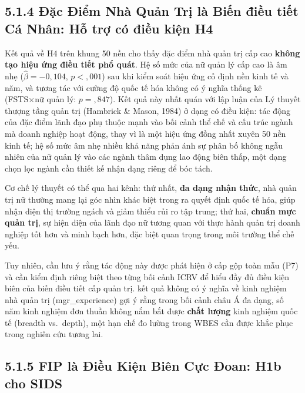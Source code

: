 \documentclass[
  a4paper,
  13pt]{extreport}
\begin{document}
\hypertarget{ux111ux1eb7c-ux111iux1ec3m-nhuxe0-quux1ea3n-trux1ecb-luxe0-biux1ebfn-ux111iux1ec1u-tiux1ebft-cuxe1-nhuxe2n-hux1ed7-trux1ee3-cuxf3-ux111iux1ec1u-kiux1ec7n-h4}{%
\subsection{5.1.4 Đặc Điểm Nhà Quản Trị là Biến điều tiết Cá Nhân: Hỗ
trợ có điều kiện
H4}\label{ux111ux1eb7c-ux111iux1ec3m-nhuxe0-quux1ea3n-trux1ecb-luxe0-biux1ebfn-ux111iux1ec1u-tiux1ebft-cuxe1-nhuxe2n-hux1ed7-trux1ee3-cuxf3-ux111iux1ec1u-kiux1ec7n-h4}}

Kết quả về H4 trên khung 50 nền cho thấy đặc điểm nhà quản trị cấp cao
\textbf{không tạo hiệu ứng điều tiết phổ quát}. Hệ số mức của nữ quản lý
cấp cao là âm nhẹ (\(\hat{\beta} = -0{,}104\), \(p < {,}001\)) sau khi
kiểm soát hiệu ứng cố định nền kinh tế và năm, và tương tác với cường độ
quốc tế hóa không có ý nghĩa thống kê (FSTS×nữ quản lý: \(p = {,}847\)).
Kết quả này nhất quán với lập luận của Lý thuyết thượng tầng quản trị
(Hambrick \& Mason, 1984) ở dạng có điều kiện: tác động của đặc điểm
lãnh đạo phụ thuộc mạnh vào bối cảnh thể chế và cấu trúc ngành mà doanh
nghiệp hoạt động, thay vì là một hiệu ứng đồng nhất xuyên 50 nền kinh
tế; hệ số mức âm nhẹ nhiều khả năng phản ánh sự phân bố không ngẫu nhiên
của nữ quản lý vào các ngành thâm dụng lao động biên thấp, một dạng chọn
lọc ngành cần thiết kế nhận dạng riêng để bóc tách.

Cơ chế lý thuyết có thể qua hai kênh: thứ nhất, \textbf{đa dạng nhận
thức}, nhà quản trị nữ thường mang lại góc nhìn khác biệt trong ra quyết
định quốc tế hóa, giúp nhận diện thị trường ngách và giảm thiểu rủi ro
tập trung; thứ hai, \textbf{chuẩn mực quản trị}, sự hiện diện của lãnh
đạo nữ tương quan với thực hành quản trị doanh nghiệp tốt hơn và minh
bạch hơn, đặc biệt quan trọng trong môi trường thể chế yếu.

Tuy nhiên, cần lưu ý rằng tác động này được phát hiện ở cấp gộp toàn mẫu
(P7) và cần kiểm định riêng biệt theo từng bối cảnh ICRV để hiểu đầy đủ
điều kiện biên của biến điều tiết cấp quản trị. kết quả không có ý nghĩa
về kinh nghiệm nhà quản trị (mgr\_experience) gợi ý rằng trong bối cảnh
châu Á đa dạng, số năm kinh nghiệm đơn thuần không nắm bắt được
\textbf{chất lượng} kinh nghiệm quốc tế (breadth vs.~depth), một hạn chế
đo lường trong WBES cần được khắc phục trong nghiên cứu tương lai.

\hypertarget{fip-luxe0-ux111iux1ec1u-kiux1ec7n-biuxean-cux1ef1c-ux111oan-h1b-cho-sids}{%
\subsection{5.1.5 FIP là Điều Kiện Biên Cực Đoan: H1b cho
SIDS}\label{fip-luxe0-ux111iux1ec1u-kiux1ec7n-biuxean-cux1ef1c-ux111oan-h1b-cho-sids}}
\end{document}
